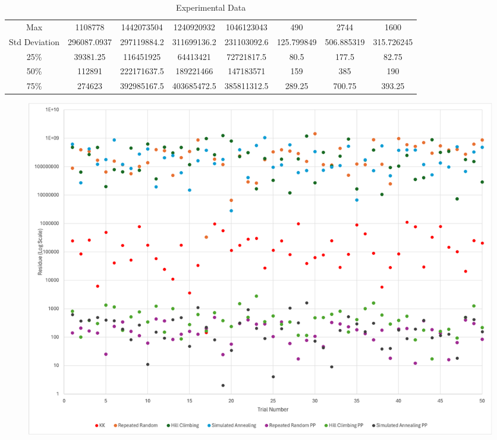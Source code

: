 \documentclass[11pt]{scrartcl}
\theoremstyle{dotlessP}
\theoremstyle{dotlessN}
\theoremstyle{dotN}
\begin{document}
\begin{table}[H]
{\begin{tabular}{c|c|c|c|c|c|c|c}
Max           & 1108778     & 1442073504      & 1240920932    & 1046123043          & 490                & 2744             & 1600                   \\
Std Deviation & 296087.0937 & 297119884.2     & 311699136.2   & 231103092.6         & 125.799849         & 506.885319       & 315.726245             \\
25\%          & 39381.25    & 116451925       & 64413421      & 72721817.5          & 80.5               & 177.5            & 82.75                  \\
50\%          & 112891      & 222171637.5     & 189221466     & 147183571           & 159                & 385              & 190                    \\
75\%          & 274623      & 392985167.5     & 403685472.5   & 385811312.5         & 289.25             & 700.75           & 393.25                
\end{tabular}}
\caption{Experimental Data}
\end{table}
\begin{figure}[H]
   \centering 
   \includegraphics[width=\textwidth]{Picture1.png}
   \end{figure}
\end{document}
